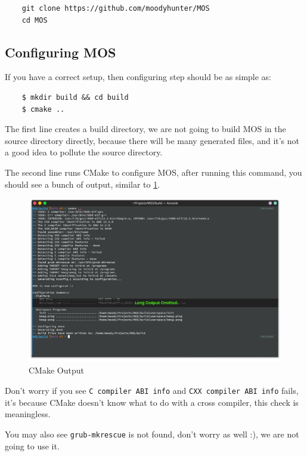 \begin{verbatim}
    git clone https://github.com/moodyhunter/MOS
    cd MOS
\end{verbatim}

\subsection{Configuring MOS}

If you have a correct setup, then configuring step should be as simple as:

\begin{verbatim}
    $ mkdir build && cd build
    $ cmake ..
\end{verbatim}

The first line creates a build directory, we are not going to build MOS in the source directory
directly, because there will be many generated files, and it's not a good idea to pollute the
source directory.

The second line runs CMake to configure MOS, after running this command, you should see a
bunch of output, similar to \ref{fig:cmake-output}.

\begin{figure}[ht]
    \centering
    \includegraphics[width=\textwidth]{assets/c1.mos-cmake-configure.png}
    \caption{CMake Output}
    \label{fig:cmake-output}
\end{figure}

Don't worry if you see \texttt{C compiler ABI info} and \texttt{CXX compiler ABI info}
fails, it's because CMake doesn't know what to do with a cross compiler, this check is meaningless.

You may also see \texttt{grub-mkrescue} is not found, don't worry as well :), we are not going to use it.

